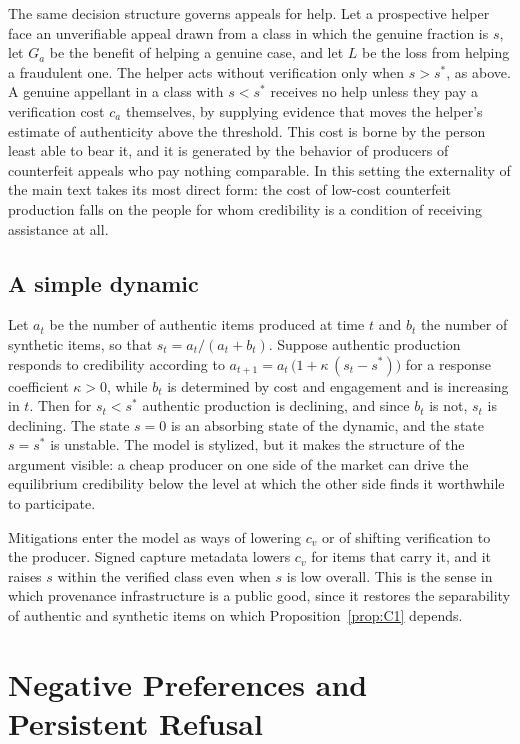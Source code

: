 \documentclass[12pt]{article}
\theoremstyle{plain}
\theoremstyle{definition}
\theoremstyle{remark}
\begin{document}
The same decision structure governs appeals for help. Let a prospective helper face an unverifiable appeal drawn from a class in which the genuine fraction is $s$, let $G_a$ be the benefit of helping a genuine case, and let $L$ be the loss from helping a fraudulent one. The helper acts without verification only when $s > s^\ast$, as above. A genuine appellant in a class with $s < s^\ast$ receives no help unless they pay a verification cost $c_a$ themselves, by supplying evidence that moves the helper's estimate of authenticity above the threshold. This cost is borne by the person least able to bear it, and it is generated by the behavior of producers of counterfeit appeals who pay nothing comparable. In this setting the externality of the main text takes its most direct form: the cost of low-cost counterfeit production falls on the people for whom credibility is a condition of receiving assistance at all.

\subsection*{A simple dynamic}

Let $a_t$ be the number of authentic items produced at time $t$ and $b_t$ the number of synthetic items, so that $s_t = a_t/(a_t + b_t)$. Suppose authentic production responds to credibility according to $a_{t+1} = a_t\,\bigl(1 + \kappa\,(s_t - s^\ast)\bigr)$ for a response coefficient $\kappa > 0$, while $b_t$ is determined by cost and engagement and is increasing in $t$. Then for $s_t < s^\ast$ authentic production is declining, and since $b_t$ is not, $s_t$ is declining. The state $s = 0$ is an absorbing state of the dynamic, and the state $s = s^\ast$ is unstable. The model is stylized, but it makes the structure of the argument visible: a cheap producer on one side of the market can drive the equilibrium credibility below the level at which the other side finds it worthwhile to participate.

Mitigations enter the model as ways of lowering $c_v$ or of shifting verification to the producer. Signed capture metadata lowers $c_v$ for items that carry it, and it raises $s$ within the verified class even when $s$ is low overall. This is the sense in which provenance infrastructure is a public good, since it restores the separability of authentic and synthetic items on which Proposition~\ref{prop:C1} depends.

\section{Negative Preferences and Persistent Refusal}
\end{document}
